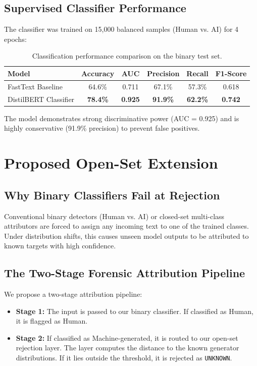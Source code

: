 \documentclass[12pt,a4paper]{report}
\begin{document}
\section{Supervised Classifier Performance}
The classifier was trained on 15,000 balanced samples (Human vs. AI) for 4 epochs:
\begin{table}[h]
\centering
\begin{tabular}{lccccc}
\toprule
\textbf{Model} & \textbf{Accuracy} & \textbf{AUC} & \textbf{Precision} & \textbf{Recall} & \textbf{F1-Score} \\
\midrule
FastText Baseline & 64.6\% & 0.711 & 67.1\% & 57.3\% & 0.618 \\
DistilBERT Classifier & \textbf{78.4\%} & \textbf{0.925} & \textbf{91.9\%} & \textbf{62.2\%} & \textbf{0.742} \\
\bottomrule
\end{tabular}
\caption{Classification performance comparison on the binary test set.}
\label{tab:supervised_results}
\end{table}

The model demonstrates strong discriminative power (AUC = 0.925) and is highly conservative (91.9\% precision) to prevent false positives.

\chapter{Proposed Open-Set Extension}
\label{ch:openset_concept}

\section{Why Binary Classifiers Fail at Rejection}
Conventional binary detectors (Human vs. AI) or closed-set multi-class attributors are forced to assign any incoming text to one of the trained classes. Under distribution shifts, this causes unseen model outputs to be attributed to known targets with high confidence.

\section{The Two-Stage Forensic Attribution Pipeline}
We propose a two-stage attribution pipeline:
\begin{itemize}
    \item \textbf{Stage 1:} The input is passed to our binary classifier. If classified as Human, it is flagged as Human.
    \item \textbf{Stage 2:} If classified as Machine-generated, it is routed to our open-set rejection layer. The layer computes the distance to the known generator distributions. If it lies outside the threshold, it is rejected as \texttt{UNKNOWN}.
\end{itemize}
\end{document}
